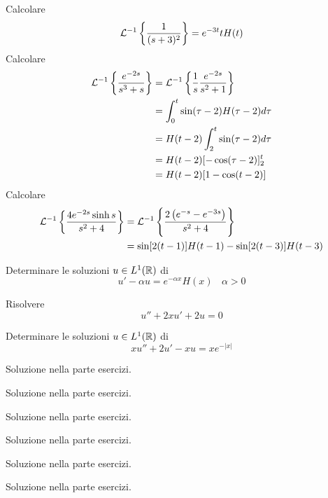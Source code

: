 Calcolare
\begin{equation*}
\mathcal{L}^{ - 1}\left\{\frac{1}{(s + 3)^{2}}\right\} = e^{ - 3t} tH(t)
\end{equation*}
Calcolare
\begin{equation*}
\begin{aligned}
\mathcal{L}^{ - 1}\left\{\frac{e^{ - 2s}}{s^{3} + s}\right\} & = \mathcal{L}^{ - 1}\left\{\frac{1}{s}\frac{e^{ - 2s}}{s^{2} + 1}\right\}\\
 & = \int ^{t}_{0}\sin(\tau - 2) H(\tau - 2) d\tau \\
 & = H(t - 2)\int ^{t}_{2}\sin(\tau - 2) d\tau \\
 & = H(t - 2)[ - \cos(\tau - 2)]^{t}_{2}\\
 & = H(t - 2)[ 1 - \cos(t - 2)]
\end{aligned}
\end{equation*}
Calcolare
\begin{equation*}
\begin{aligned}
\mathcal{L}^{ - 1}\left\{\frac{4e^{ - 2s}\sinh s}{s^{2} + 4}\right\} & = \mathcal{L}^{ - 1}\left\{\frac{2\left(e^{ - s} - e^{ - 3s}\right)}{s^{2} + 4}\right\}\\
 & = \sin[ 2(t - 1)] H(t - 1) - \sin[ 2(t - 3)] H(t - 3)
\end{aligned}
\end{equation*}
\Esercizio{}

Determinare le soluzioni $u\in L^{1}(\mathbb{R})$ di
\begin{equation*}
u' - \alpha u = e^{ - \alpha x} H(x) \ \ \ \ \alpha  > 0
\end{equation*}
\Esercizio{}

Risolvere
\begin{equation*}
u'' + 2xu' + 2u = 0
\end{equation*}
\Esercizio{}

Determinare le soluzioni $u\in L^{1}(\mathbb{R})$ di
\begin{equation*}
xu'' + 2u' - xu = xe^{ - | x| }
\end{equation*}
\ParteSoluzioni
\Soluzione

Soluzione nella parte esercizi.
\Soluzione

Soluzione nella parte esercizi.
\Soluzione

Soluzione nella parte esercizi.
\Soluzione

Soluzione nella parte esercizi.
\Soluzione

Soluzione nella parte esercizi.
\Soluzione

Soluzione nella parte esercizi.
\Soluzione

